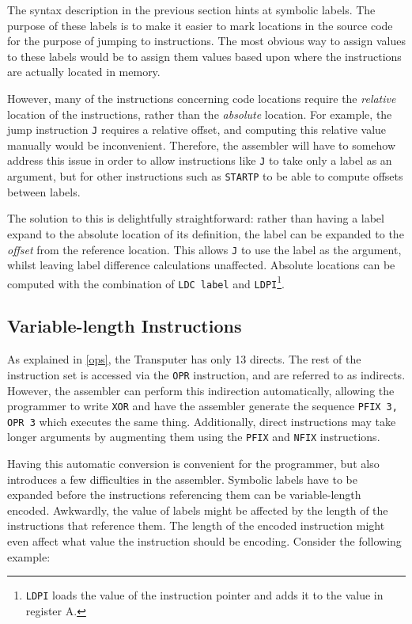 The syntax description in the previous section hints at symbolic labels. The
purpose of these labels is to make it easier to mark locations in the source
code for the purpose of jumping to instructions. The most obvious way to assign
values to these labels would be to assign them values based upon where the
instructions are actually located in memory.

However, many of the instructions concerning code locations require the
\textit{relative} location of the instructions, rather than the
\textit{absolute} location. For example, the jump instruction \texttt{J}
requires a relative offset, and computing this relative value manually would be
inconvenient. Therefore, the assembler will have to somehow address this issue
in order to allow instructions like \texttt{J} to take only a label as an
argument, but for other instructions such as \texttt{STARTP} to be able to
compute offsets between labels.

The solution to this is delightfully straightforward: rather than having a label
expand to the absolute location of its definition, the label can be expanded to
the \textit{offset} from the reference
location\textsuperscript{\cite{supervisor}}. This allows \texttt{J} to use the
label as the argument, whilst leaving label difference calculations unaffected.
Absolute locations can be computed with the combination of \texttt{LDC label}
and \texttt{LDPI}\footnote{\texttt{LDPI} loads the value of the instruction
pointer and adds it to the value in register A.}.

\subsection{Variable-length Instructions}

As explained in \ref{ops}, the Transputer has only 13 \gls{direct}s. The rest of
the instruction set is accessed via the \texttt{OPR} instruction, and are
referred to as \gls{indirect}s. However, the assembler can perform this
indirection automatically, allowing the programmer to write \texttt{XOR} and
have the assembler generate the sequence \texttt{PFIX 3, OPR 3} which executes
the same thing. Additionally, direct instructions may take longer arguments by
augmenting them using the \texttt{PFIX} and \texttt{NFIX} instructions.

Having this automatic conversion is convenient for the programmer, but also
introduces a few difficulties in the assembler. Symbolic labels have to be
expanded before the instructions referencing them can be variable-length
encoded. Awkwardly, the value of labels might be affected by the length of
the instructions that reference them. The length of the encoded instruction
might even affect what value the instruction should be encoding.
Consider the following example:

